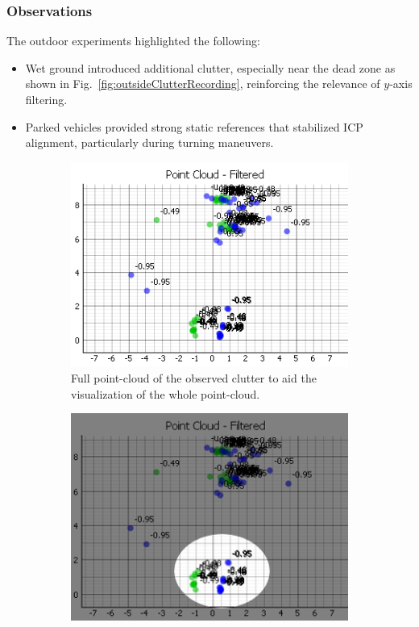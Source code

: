 \subsubsection{Observations}
The outdoor experiments highlighted the following:
\begin{itemize}
    \item Wet ground introduced additional clutter, especially near the dead zone as shown in Fig.~\ref{fig:outsideClutterRecording}, reinforcing the relevance of $y$-axis filtering.
    \item Parked vehicles provided strong static references that stabilized ICP alignment, particularly during turning maneuvers.
\end{itemize}

\begin{figure}[!htbp]
    \centering
    \begin{subfigure}{0.48\linewidth}
        \centering
        \includegraphics[width=\linewidth]{images/sensorClutterYAxisDualSensor.png}
        \caption{Full point-cloud of the observed clutter to aid the visualization of the whole point-cloud.}
        \label{fig:simpleClutter}
    \end{subfigure}
    \hfill
    \begin{subfigure}{0.48\linewidth}
        \centering
        \includegraphics[width=\linewidth]{images/sensorClutterYAxisDualSensorHighlited.png}

\end{subfigure}
\end{figure}
